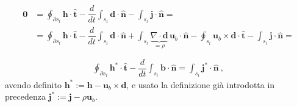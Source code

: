\documentclass[letterpaper,10pt,english]{jupyterBook}
\begin{document}
\sphinxAtStartPar
{}
\begin{equation*}
\begin{split}\begin{aligned}
    \mathbf{0} & = \oint_{\partial s_t} \mathbf{h} \cdot \hat{\mathbf{t}} - \dfrac{d}{dt} \int_{s_t} \mathbf{d} \cdot \hat{\mathbf{n}} - \int_{s_t} \mathbf{j} \cdot \hat{\mathbf{n}} = \\
    & = \oint_{\partial s_t} \mathbf{h} \cdot \hat{\mathbf{t}} - \dfrac{d}{dt} \int_{s_t} \mathbf{d} \cdot \hat{\mathbf{n}} + \int_{s_t} \underbrace{\nabla \cdot \mathbf{d}}_{=\rho} \, \mathbf{u}_b \cdot \hat{\mathbf{n}} - \oint_{s_t} \mathbf{u}_b \times \mathbf{d} \cdot \hat{\mathbf{t}} - \int_{s_t} \mathbf{j} \cdot \hat{\mathbf{n}} =  \\
\end{aligned}\end{split}
\end{equation*}\begin{equation*}
\begin{split}
    \oint_{\partial s_t} \mathbf{h}^* \cdot \hat{\mathbf{t}} - \dfrac{d}{dt} \int_{s_t} \mathbf{b} \cdot \hat{\mathbf{n}} = \int_{s_t} \mathbf{j}^* \cdot \hat{\mathbf{n}} \ ,
\end{split}
\end{equation*}
\sphinxAtStartPar
avendo definito \(\mathbf{h}^* := \mathbf{h} - \mathbf{u}_b \times \mathbf{d}\), e usato la definizione già introdotta in precedenza \(\mathbf{j}^* := \mathbf{j} - \rho \mathbf{u}_b\).
\end{document}
